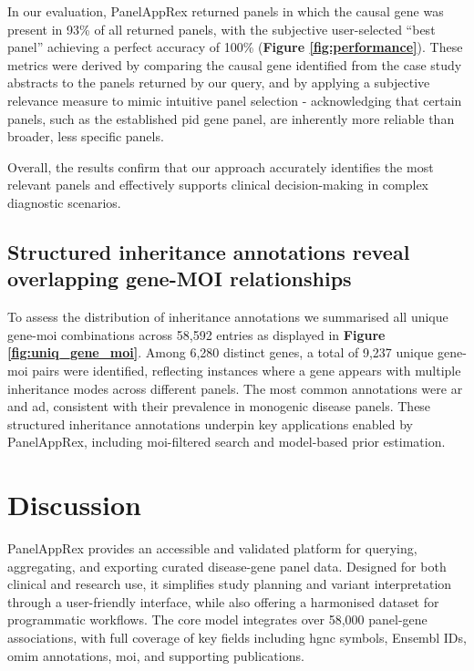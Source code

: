 In our evaluation, PanelAppRex returned panels in which the causal gene was present in 93\% of all returned panels, with the subjective user-selected ``best panel'' achieving a perfect accuracy of 100\% 
(\textbf{Figure \ref{fig:performance}}).
 These metrics were derived by comparing the causal gene identified from the case study abstracts to the panels returned by our query, and by applying a subjective relevance measure to mimic intuitive panel selection - acknowledging that certain panels, such as the established \ac{pid} gene panel, are inherently more reliable than broader, less specific panels.
 
Overall, the results confirm that our approach accurately identifies the most relevant panels and effectively supports clinical decision-making in complex diagnostic scenarios.


\subsection{Structured inheritance annotations reveal overlapping gene-MOI relationships}

To assess the distribution of inheritance annotations we summarised all unique gene-\ac{moi} combinations across 58,592 entries as displayed in 
\textbf{Figure \ref{fig:uniq_gene_moi}}. Among 6,280 distinct genes, a total of 9,237 unique gene-\ac{moi} pairs were identified, reflecting instances where a gene appears with multiple inheritance modes across different panels. 
The most common annotations were \ac{ar} and \ac{ad}, consistent with their prevalence in monogenic disease panels. 
These structured inheritance annotations underpin key applications 
enabled by PanelAppRex, including \ac{moi}-filtered search and model-based prior estimation.


\FloatBarrier
\section{Discussion}
\noindent
PanelAppRex provides an accessible and validated platform for querying, aggregating, and exporting curated disease-gene panel data. Designed for both clinical and research use, it simplifies study planning and variant interpretation through a user-friendly interface, while also offering a harmonised dataset for programmatic workflows. The core model integrates over 58,000 panel-gene associations, with full coverage of key fields including \ac{hgnc} symbols, Ensembl IDs, \ac{omim} annotations, \ac{moi}, and supporting publications.

